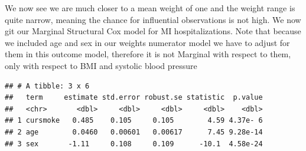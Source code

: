 \documentclass[
]{book}
\newenvironment{Shaded}{\begin{snugshade}}{\end{snugshade}}
\newcommand{\DataTypeTok}[1]{\textcolor[rgb]{0.13,0.29,0.53}{#1}}
\newcommand{\FloatTok}[1]{\textcolor[rgb]{0.00,0.00,0.81}{#1}}
\newcommand{\KeywordTok}[1]{\textcolor[rgb]{0.13,0.29,0.53}{\textbf{#1}}}
\newcommand{\NormalTok}[1]{#1}
\newcommand{\OperatorTok}[1]{\textcolor[rgb]{0.81,0.36,0.00}{\textbf{#1}}}
\newcommand{\StringTok}[1]{\textcolor[rgb]{0.31,0.60,0.02}{#1}}
\begin{document}
We now see we are much closer to a mean weight of one and the weight range is quite narrow, meaning the chance for influential observations is not high. We now git our Marginal Structural Cox model for MI hospitalizations. Note that because we included age and sex in our weights numerator model we have to adjust for them in this outcome model, therefore it is not Marginal with respect to them, only with respect to BMI and systolic blood pressure

\begin{Shaded}
\end{Shaded}

\begin{verbatim}
## # A tibble: 3 x 6
##   term     estimate std.error robust.se statistic  p.value
##   <chr>       <dbl>     <dbl>     <dbl>     <dbl>    <dbl>
## 1 cursmoke   0.485    0.105     0.105        4.59 4.37e- 6
## 2 age        0.0460   0.00601   0.00617      7.45 9.28e-14
## 3 sex       -1.11     0.108     0.109      -10.1  4.58e-24
\end{verbatim}

\begin{Shaded}
\end{Shaded}
\end{document}
